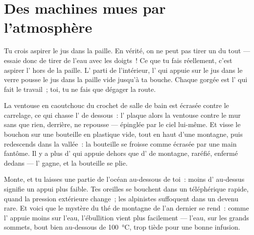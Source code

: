\section{Des machines mues par l'atmosphère}

\begin{example}[La paille]\label{ex:g5:air-pressure-weather:straw}
Tu crois aspirer le jus dans la paille. En vérité, on ne peut pas
tirer un  du tout --- essaie donc de tirer de l'eau avec les
doigts~! Ce que tu fais réellement, c'est aspirer l'\emph{} hors
de la paille. L' parti de l'intérieur, l' qui appuie sur
le jus dans le verre pousse le jus dans la paille vide jusqu'à ta
bouche. Chaque gorgée est l' qui fait le travail~; toi, tu
ne fais que dégager la route.
\end{example}

\begin{example}\label{ex:g5:air-pressure-weather:suction}
La ventouse en caoutchouc du crochet de salle de bain est écrasée
contre le carrelage, ce qui chasse l' de dessous~: l'
plaque alors la ventouse contre le mur sans que rien, derrière, ne
repousse --- épinglée par le ciel lui-même. Et visse le bouchon sur
une bouteille en plastique vide, tout en haut d'une montagne, puis
redescends dans la vallée~: la bouteille se froisse comme écrasée par
une main fantôme. Il y a plus d' qui appuie dehors que d' de
montagne, raréfié, enfermé dedans --- l' gagne, et la
bouteille se plie.
\end{example}

\begin{example}\label{ex:g5:air-pressure-weather:height}
Monte, et tu laisses une partie de l'océan au-dessous de toi~: moins
d' au-dessus signifie un appui plus faible. Tes oreilles se
bouchent dans un téléphérique rapide, quand la pression extérieure
change~; les alpinistes suffoquent dans un  devenu rare. Et voici
que le mystère du thé de montagne de l'an dernier se rend~: comme
l' appuie moins sur l'eau, l'ébullition vient plus
facilement --- l'eau, sur les grands sommets, bout bien au-dessous de
\qty{100}{\celsius}, trop tiède pour une bonne infusion.
\end{example}

